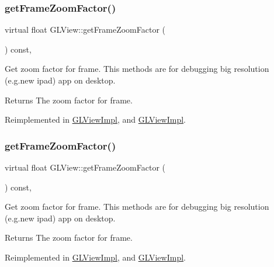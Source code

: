 \subsubsection{\texorpdfstring{get\+Frame\+Zoom\+Factor()}{getFrameZoomFactor()}\hspace{0.1cm}{\footnotesize\ttfamily [1/2]}}
{\footnotesize\ttfamily virtual float G\+L\+View\+::get\+Frame\+Zoom\+Factor (\begin{DoxyParamCaption}{ }\end{DoxyParamCaption}) const\hspace{0.3cm}{\ttfamily [inline]}, {\ttfamily [virtual]}}

Get zoom factor for frame. This methods are for debugging big resolution (e.\+g.\+new ipad) app on desktop.

\begin{DoxyReturn}{Returns}
The zoom factor for frame. 
\end{DoxyReturn}


Reimplemented in \hyperlink{classGLViewImpl_a16f58cd2c122ecf8f3feb7bca6f4309d}{G\+L\+View\+Impl}, and \hyperlink{classGLViewImpl_a16f58cd2c122ecf8f3feb7bca6f4309d}{G\+L\+View\+Impl}.

\mbox{\label{classGLView_ab804d7568f68b8d91cf420d1c0057f38}} 
\subsubsection{\texorpdfstring{get\+Frame\+Zoom\+Factor()}{getFrameZoomFactor()}\hspace{0.1cm}{\footnotesize\ttfamily [2/2]}}
{\footnotesize\ttfamily virtual float G\+L\+View\+::get\+Frame\+Zoom\+Factor (\begin{DoxyParamCaption}{ }\end{DoxyParamCaption}) const\hspace{0.3cm}{\ttfamily [inline]}, {\ttfamily [virtual]}}

Get zoom factor for frame. This methods are for debugging big resolution (e.\+g.\+new ipad) app on desktop.

\begin{DoxyReturn}{Returns}
The zoom factor for frame. 
\end{DoxyReturn}


Reimplemented in \hyperlink{classGLViewImpl_a16f58cd2c122ecf8f3feb7bca6f4309d}{G\+L\+View\+Impl}, and \hyperlink{classGLViewImpl_a16f58cd2c122ecf8f3feb7bca6f4309d}{G\+L\+View\+Impl}.

